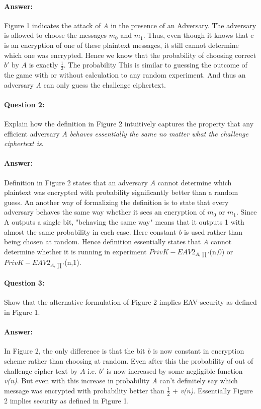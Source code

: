 \documentclass{article}
\begin{document}
    \paragraph{Answer: \newline}
        Figure 1 indicates the attack of \emph{A} in the presence of an Adversary. The adversary is allowed to choose the messages $\mathit{m_0}$ and $\mathit{m_1}$. Thus, even though it knows that c is an encryption of one of these plaintext messages, it still cannot determine which one was encrypted. Hence we know that the probability of choosing correct $b\prime$ by $\mathit{A}$ is exactly $\frac{1}{2}$. The probability  This is similar to guessing the outcome of the game with or without calculation to any random experiment. And thus an adversary \emph{A} can only guess the challenge ciphertext. \cite{section2question12}
    
    \paragraph{Question 2:} Explain how the definition in Figure 2 intuitively captures the property that any efficient adversary $\mathit{A}$ \emph{behaves essentially the same no matter what the challenge ciphertext is}.
    \paragraph{Answer: \newline}
        Definition in Figure 2 states that an adversary $\mathit{A}$ cannot determine which plaintext was encrypted with probability significantly better than a random guess. An another way of formalizing the definition is to state that every adversary behaves the same way whether it sees an encryption of $\mathit{m_0}$ or $\mathit{m_1}$. Since A outputs a single bit, "behaving the same way" means that it outputs 1 with almost the same probability in each case. Here constant \emph{b} is used rather than being chosen at random. Hence definition essentially states that \emph{A} cannot determine whether it is running in experiment $PrivK-EAV2_{A,\prod'}$(n,0) or $PrivK-EAV2_{A,\prod'}$(n,1).
    
    \paragraph{Question 3:} Show that the alternative formulation of Figure 2 implies EAV-security as defined in Figure 1.
    \paragraph{Answer: \newline}
        In Figure 2, the only difference is that the bit \emph{b} is now constant in encryption scheme rather than choosing at random. 
        Even after this the probability of out of challenge cipher text by $\mathit{A}$ i.e. $b\prime$ is now increased by some negligible function \emph{v(n)}. But even with this increase in probability \emph{A} can't definitely say which message was encrypted with probability better than $\frac{1}{2}$ + \emph{v(n)}. Essentially Figure 2 implies security as defined in Figure 1.
    
\end{document}
